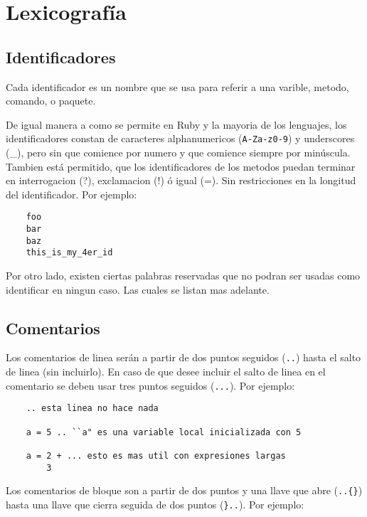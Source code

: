 \documentclass[12pt,letterpaper,titlepage,oneside,openright]{book}
\newcommand{\ttcode}[1]{(\texttt{#1})}
\begin{document}
\section{Lexicografía}

\subsection{Identificadores}

Cada identificador es un nombre que se usa para referir a una varible, metodo,
comando, o paquete. 

De igual manera a como se permite en Ruby y la mayoria de los lenguajes, los
identificadores constan de caracteres alphanumericos (\verb|A-Za-z0-9|) y
underscores (\_), pero sin que comience por numero y que comience siempre por
minúscula. Tambien está permitido, que los identificadores de los metodos puedan
terminar en interrogacion (?), exclamacion (!) ó igual (=). Sin restricciones
en la longitud del identificador. Por ejemplo:

\begin{center}
\begin{lstlisting}
    foo
    bar
    baz
    this_is_my_4er_id
\end{lstlisting}
\end{center}

Por otro lado, existen ciertas palabras reservadas que no podran ser usadas como
identificar en ningun caso. Las cuales se listan mas adelante.

\subsection{Comentarios}

Los comentarios de linea serán a partir de dos puntos seguidos \ttcode{..} hasta
el salto de linea (sin incluirlo). En caso de que desee incluir el salto de
linea en el comentario se deben usar tres puntos seguidos \ttcode{...}. Por
ejemplo:

\begin{center}
\begin{lstlisting}
    .. esta linea no hace nada

    a = 5 .. ``a" es una variable local inicializada con 5

    a = 2 + ... esto es mas util con expresiones largas
        3
\end{lstlisting}
\end{center}

Los comentarios de bloque son a partir de dos puntos y una llave que abre
\ttcode{..\{\}} hasta una llave que cierra seguida de dos puntos \ttcode{\}..}. Por
ejemplo:
\end{document}
